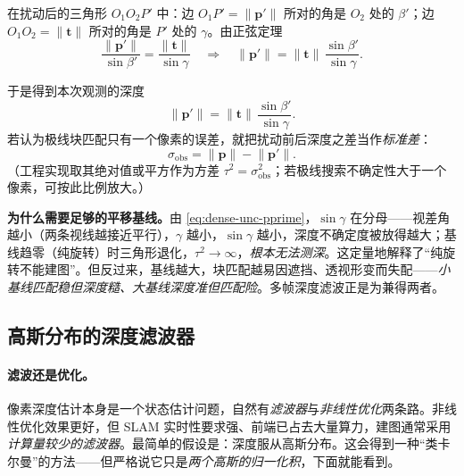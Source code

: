 \begin{derivation}
在扰动后的三角形 $O_1O_2P'$ 中：边 $O_1P'=\|\mathbf{p}'\|$ 所对的角是 $O_2$ 处的 $\beta'$；边 $O_1O_2=\|\mathbf{t}\|$ 所对的角是 $P'$ 处的 $\gamma$。由正弦定理
\[
  \frac{\|\mathbf{p}'\|}{\sin\beta'}=\frac{\|\mathbf{t}\|}{\sin\gamma}
  \quad\Longrightarrow\quad
  \|\mathbf{p}'\|=\|\mathbf{t}\|\,\frac{\sin\beta'}{\sin\gamma}.
\]
\end{derivation}

\noindent{}于是得到本次观测的深度
\begin{equation}
  \|\mathbf{p}'\|=\|\mathbf{t}\|\,\frac{\sin\beta'}{\sin\gamma}.
  \label{eq:dense-unc-pprime}
\end{equation}
若认为极线块匹配只有一个像素的误差，就把扰动前后深度之差当作\emph{标准差}：
\begin{equation}
  \sigma_{\mathrm{obs}}=\bigl\|\mathbf{p}\bigr\|-\bigl\|\mathbf{p}'\bigr\|.
  \label{eq:dense-unc-sigma}
\end{equation}
（工程实现取其绝对值或平方作为方差 $\tau^2=\sigma_{\mathrm{obs}}^2$；若极线搜索不确定性大于一个像素，可按此比例放大。）

\begin{insight}
\textbf{为什么需要足够的平移基线。}由 \cref{eq:dense-unc-pprime}，$\sin\gamma$ 在分母——视差角越小（两条视线越接近平行），$\gamma$ 越小，$\sin\gamma$ 越小，深度不确定度被放得越大；基线趋零（纯旋转）时三角形退化，$\tau^2\to\infty$，\emph{根本无法测深}。这定量地解释了“纯旋转不能建图”。但反过来，基线越大，块匹配越易因遮挡、透视形变而失配——\emph{小基线匹配稳但深度糙、大基线深度准但匹配险}。多帧深度滤波正是为兼得两者。
\end{insight}

\subsection{高斯分布的深度滤波器}
\label{sec:dense-depth-filter}

\paragraph{滤波还是优化。}
像素深度估计本身是一个状态估计问题，自然有\emph{滤波器}与\emph{非线性优化}两条路。非线性优化效果更好，但 SLAM 实时性要求强、前端已占去大量算力，建图通常采用\emph{计算量较少的滤波器}\cite{gaoxiang2019slam14}。最简单的假设是：深度服从高斯分布。这会得到一种“类卡尔曼”的方法——但严格说它只是\emph{两个高斯的归一化积}，下面就能看到。

